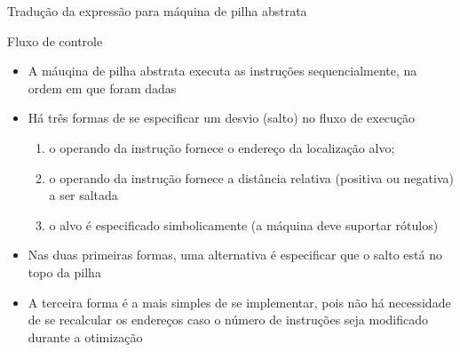 \begin{frame}[fragile]{Tradução da expressão  para máquina de pilha abstrata}
\end{frame}

\begin{frame}[fragile]{Fluxo de controle}

    \begin{itemize}
        \item A máuqina de pilha abstrata executa as instruções sequencialmente, na ordem em que foram dadas
        \pause

        \item Há três formas de se especificar um desvio (salto) no fluxo de execução
        \pause
        \begin{enumerate}
            \item o operando da instrução fornece o endereço da localização alvo;
            \pause 

            \item o operando da instrução fornece a distância relativa (positiva ou negativa) a ser saltada
            \pause

            \item o alvo é especificado simbolicamente (a máquina deve suportar rótulos)
            \pause
        \end{enumerate}

        \item Nas duas primeiras formas, uma alternativa é especificar que o salto está no topo da pilha
        \pause

        \item A terceira forma é a mais simples de se implementar, pois não há necessidade de se recalcular os endereços caso o número de instruções seja
            modificado durante a otimização
    \end{itemize}

\end{frame}

